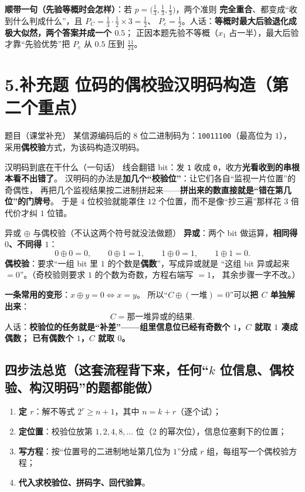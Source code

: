\documentclass[11pt,a4paper]{ctexart}
\begin{document}
\textbf{顺带一句（先验等概时会怎样）}：若 $p=\bigl(\frac13,\frac13,\frac13\bigr)$，两个准则
\textbf{完全重合}、都变成“收到什么判成什么”，且 $P_C=\frac13\cdot\frac12\times3=\frac12$、
$P_e=\frac12$。人话：\textbf{等概时最大后验退化成极大似然，两个答案并成一个 $0.5$}；
正因本题先验不等概（$x_1$ 占一半），最大后验才靠“先验优势”把 $P_e$ 从 $0.5$ 压到 $\frac{11}{24}$。

\section{5.补充题 位码的偶校验汉明码构造（第二个重点）}

\begin{defbox}{题目（课堂补充）}
某信源编码后的 $8$ 位二进制码为：\texttt{10011100}（最高位为 $1$），
采用\textbf{偶校验}方式，为该码构造汉明码。
\end{defbox}

\begin{idea}{汉明码到底在干什么（一句话）}
线会翻错 bit：发 \texttt{1} 收成 \texttt{0}，收方\textbf{光看收到的串根本看不出错了}。
汉明码的办法是\textbf{加几个“校验位”}：让它们各自“监视一片位置”的奇偶性，
再把几个监视结果按二进制拼起来——\textbf{拼出来的数直接就是“错在第几位”的门牌号}。
于是 $4$ 位校验就能罩住 $12$ 个位置，而不是像“抄三遍”那样花 $3$ 倍代价才纠 $1$ 位错。
\end{idea}

\begin{defbox}{异或 $\oplus$ 与偶校验（不认这两个符号就没法做题）}
\textbf{异或}：两个 bit 做运算，\textbf{相同得 $0$、不同得 $1$}：
\[
0\oplus0=0,\qquad 0\oplus1=1,\qquad 1\oplus0=1,\qquad 1\oplus1=0 .
\]
\textbf{偶校验}：要求“一组 bit 里 $1$ 的个数是\textbf{偶数}”，写成异或就是
“这组 bit 异或起来 $=0$”。（奇校验则要求 $1$ 的个数为奇数，方程右端写 $=1$，
其余步骤一字不改。）

\textbf{一条常用的变形}：$x\oplus y=0\iff x=y$。
所以“$C\oplus(\text{一堆}) =0$”可以\textbf{把 $C$ 单独解出来}：
\[
C=\text{那一堆异或的结果}.
\]
人话：\textbf{校验位的任务就是“补差”——组里信息位已经有奇数个 $1$，$C$ 就取 $1$ 凑成偶数；
已有偶数个 $1$，$C$ 就取 $0$。}
\end{defbox}

\subsection{四步法总览（这套流程背下来，任何“$k$ 位信息、偶校验、构汉明码”的题都能做）}
\begin{enumerate}[leftmargin=1.8em,itemsep=2pt,topsep=2pt]
  \item \textbf{定 $r$}：解不等式 $2^{r}\ge n+1$，其中 $n=k+r$（逐个试）；
  \item \textbf{定位置}：校验位放第 $1,2,4,8,\dots$ 位（$2$ 的幂次位），信息位塞剩下的位置；
  \item \textbf{写方程}：按“位置号的二进制地址第几位为 $1$”分成 $r$ 组，每组写一个偶校验方程；
  \item \textbf{代入求校验位、拼码字、回代验算}。
\end{enumerate}
\end{document}
